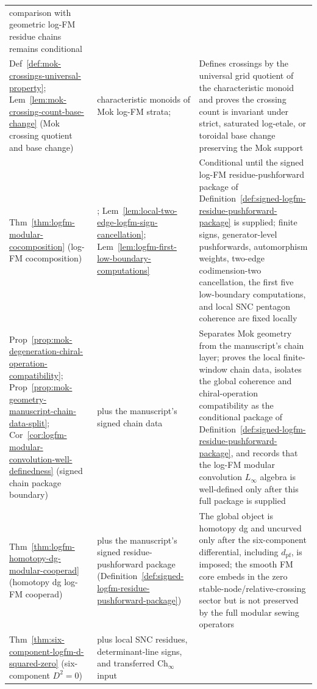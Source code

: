 \begin{remark}
\begin{tabular}{p{4.8cm}p{4.2cm}p{5.5cm}}
 comparison with geometric log-FM residue chains remains conditional \\
Def~\ref{def:mok-crossings-universal-property};
Lem~\ref{lem:mok-crossing-count-base-change}
 (Mok crossing quotient and base change)
 & characteristic monoids of Mok log-FM strata; \cite[\S2.3,
 Def~3.1.5]{Mok25}
 & Defines crossings by the universal grid quotient of the
 characteristic monoid and proves the crossing count is invariant under
 strict, saturated log-etale, or toroidal base change preserving the
 Mok support \\
Thm~\ref{thm:logfm-modular-cocomposition}
 (log-FM cocomposition)
 & \cite[Thm~3.3.1, Cor~5.3.4]{Mok25};
 Lem~\ref{lem:local-two-edge-logfm-sign-cancellation};
 Lem~\ref{lem:logfm-first-low-boundary-computations}
 & Conditional until the signed log-FM residue-pushforward package of
 Definition~\ref{def:signed-logfm-residue-pushforward-package} is
 supplied;
 finite signs, generator-level pushforwards, automorphism weights,
 two-edge codimension-two cancellation, the first five low-boundary
 computations, and local SNC pentagon coherence are fixed locally \\
Prop~\ref{prop:mok-degeneration-chiral-operation-compatibility};
Prop~\ref{prop:mok-geometry-manuscript-chain-data-split};
Cor~\ref{cor:logfm-modular-convolution-well-definedness}
 (signed chain package boundary)
 & \cite[Cor~5.3.4]{Mok25} plus the manuscript's signed chain data
 & Separates Mok geometry from the manuscript's chain layer; proves the
 local finite-window chain data, isolates the global coherence and
 chiral-operation compatibility as the conditional package of
 Definition~\ref{def:signed-logfm-residue-pushforward-package}, and
 records that the
 log-FM modular convolution $L_\infty$ algebra is well-defined only
 after this full package is supplied \\
Thm~\ref{thm:logfm-homotopy-dg-modular-cooperad}
 (homotopy dg log-FM cooperad)
 & \cite[Thm~3.3.1, Cor~5.3.4]{Mok25} plus the manuscript's signed
 residue-pushforward package
 (Definition~\ref{def:signed-logfm-residue-pushforward-package})
 & The global object is homotopy dg and uncurved only after the
 six-component differential, including $d_{\mathrm{pf}}$, is imposed;
 the smooth FM core embeds in the zero stable-node/relative-crossing
 sector but is not preserved by the full modular sewing operators \\
Thm~\ref{thm:six-component-logfm-d-squared-zero}
 (six-component $D^2=0$)
 & \cite[Thm~3.3.1, Cor~5.3.4]{Mok25} plus local SNC residues,
 determinant-line signs, and transferred $\mathrm{Ch}_\infty$ input

\end{tabular}
\end{remark}
